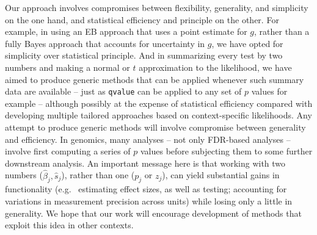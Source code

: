 \documentclass[11pt]{article}
\def\bhat{\hat{\beta}}
\def\shat{\hat{s}}
\def\qvalue{{\tt qvalue}\xspace}
\def\locfdr{{\tt locfdr}\xspace}
\def\mixfdr{{\tt mixfdr}\xspace}
\begin{document}
Our approach involves compromises between flexibility, generality, and simplicity on the one hand, and statistical efficiency and principle on the other.
For example, in using an EB approach that uses a point estimate for $g$, rather than a fully Bayes approach that accounts for uncertainty in $g$,
we have opted for simplicity over statistical principle. And in summarizing every test by
two numbers and making a normal or $t$ approximation to the likelihood, we have aimed to produce generic methods that 
 can be applied whenever such summary data are available -- just as \qvalue can be applied to any set of $p$ values for example -- although
 possibly at the expense of statistical efficiency compared with developing multiple tailored approaches based on context-specific likelihoods. 
 Any attempt to produce generic methods will involve compromise between generality and efficiency.
 In genomics, many analyses -- not only FDR-based analyses -- involve first computing a series of $p$ values before
 subjecting them to some further downstream analysis. An important message here is 
 that working with two numbers ($\bhat_j,\shat_j$), rather than one ($p_j$ or $z_j$), 
 can yield substantial gains in functionality (e.g.~ estimating effect sizes, as well as testing; accounting for variations in
measurement precision across units) while losing only a little in generality.  We hope that our work will
encourage development of methods that exploit this idea in other contexts.

 



%
%
%
%
\end{document}
